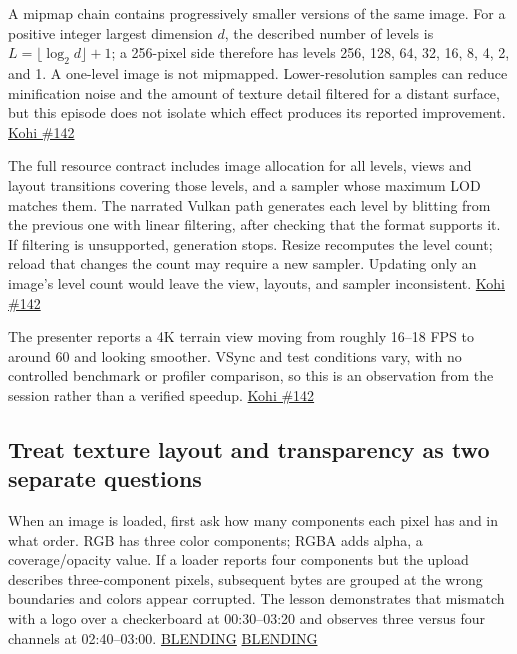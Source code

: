 A mipmap chain contains progressively smaller versions of the same image. For a positive integer largest dimension \(d\), the described number of levels is \(L=\lfloor\log_2 d\rfloor+1\); a 256-pixel side therefore has levels 256, 128, 64, 32, 16, 8, 4, 2, and 1. A one-level image is not mipmapped. Lower-resolution samples can reduce minification noise and the amount of texture detail filtered for a distant surface, but this episode does not isolate which effect produces its reported improvement. \href{https://www.youtube.com/watch?v=xb23Y9o7tP4}{Kohi \#142}

The full resource contract includes image allocation for all levels, views and layout transitions covering those levels, and a sampler whose maximum LOD matches them. The narrated Vulkan path generates each level by blitting from the previous one with linear filtering, after checking that the format supports it. If filtering is unsupported, generation stops. Resize recomputes the level count; reload that changes the count may require a new sampler. Updating only an image's level count would leave the view, layouts, and sampler inconsistent. \href{https://www.youtube.com/watch?v=xb23Y9o7tP4}{Kohi \#142}

The presenter reports a 4K terrain view moving from roughly 16--18 FPS to around 60 and looking smoother. VSync and test conditions vary, with no controlled benchmark or profiler comparison, so this is an observation from the session rather than a verified speedup. \href{https://www.youtube.com/watch?v=xb23Y9o7tP4}{Kohi \#142}

\subsection{Treat texture layout and transparency as two separate questions}\label{06-engine-ii-ch027-treat-texture-layout-and-transparency-as-two-separate-questions}

\hypertarget{06-engine-ii-ch027-treat-texture-layout-and-transparency-as-two-separate-questions}{}

When an image is loaded, first ask how many components each pixel has and in what order. RGB has three color components; RGBA adds alpha, a coverage/opacity value. If a loader reports four components but the upload describes three-component pixels, subsequent bytes are grouped at the wrong boundaries and colors appear corrupted. The lesson demonstrates that mismatch with a logo over a checkerboard at 00:30--03:20 and observes three versus four channels at 02:40--03:00. \href{https://www.youtube.com/watch?v=N94fHNZEHas&t=30s}{BLENDING} \href{https://www.youtube.com/watch?v=N94fHNZEHas&t=160s}{BLENDING}

